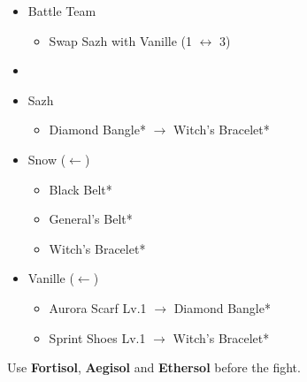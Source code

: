 \begin{menu}
	\begin{itemize}
	\paradigm
		\begin{itemize}
			\item Battle Team
				\begin{itemize}
					\item Swap Sazh with Vanille (1 $\leftrightarrow$ 3)
				\end{itemize}
			\item {}%
				{\paradigmline{\com}{\com}{\com}}%
				{\paradigmline{(\sab)}{(\sen)}{\rav}}%
				{\paradigmline{(\rav)}{\com}{(\rav)}}%
				{\paradigmline[4]{(\sab)}{\sen}{(\rav)}}%
				{\paradigmline{\med}{(\syn)}{\syn}}%
				{\paradigmline{(\sen)}{(\sen)}{(\sen)}}%
		\end{itemize}
	\equip
		\begin{itemize}
			\item Sazh
				\begin{itemize}
					\item Diamond Bangle* $\rightarrow$ Witch's Bracelet*
				\end{itemize}
			\item Snow ($\leftarrow$)
				\begin{itemize}
					\item Black Belt*
					\item General's Belt*
					\item Witch's Bracelet*
				\end{itemize}
			\item Vanille ($\leftarrow$)
				\begin{itemize}
					\item Aurora Scarf Lv.1 $\rightarrow$ Diamond Bangle*
					\item Sprint Shoes Lv.1 $\rightarrow$ Witch's Bracelet*
				\end{itemize}
		\end{itemize}
	\end{itemize}
\end{menu}

\renewcommand{\first}{[1] Cerberus (\com/\com/\com)}
\renewcommand{\second}{[2] Matador (\sab/\sen/\rav)}
\renewcommand{\third}{[3] Relentless Assault (\rav/\com/\rav)}
\renewcommand{\fourth}{[4] Matador (\sab/\sen/\rav)}
\renewcommand{\fifth}{[5] Recuperation (\med/\syn/\syn)}
\renewcommand{\sixth}{[6] Tortoise (\sen/\sen/\sen)}

Use \textbf{Fortisol}, \textbf{Aegisol} and \textbf{Ethersol} before the fight.

